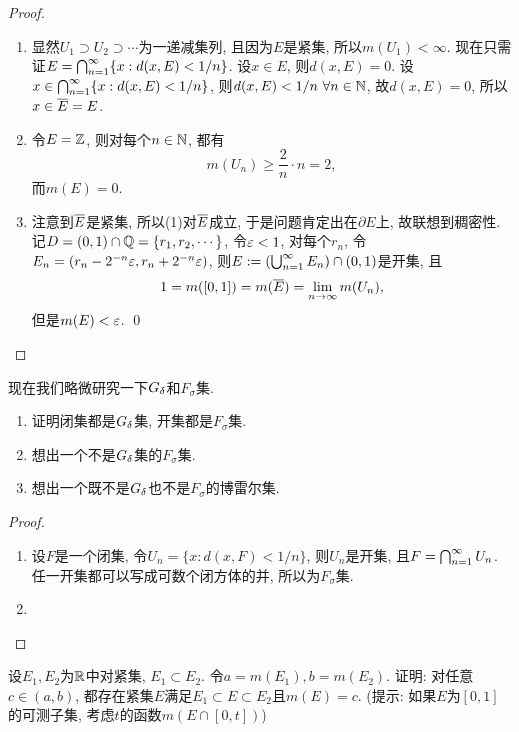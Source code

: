 \begin{proof}
    \begin{enumerate}
    \item 显然$U_1 \supset U_2 \supset \cdots$为一递减集列, 且因为$E$是紧集, 所以$m(U_1) < \infty$. 
    现在只需证$E = \bigcap_{n=1}^{\infty}\{x:d(x,E) < 1/n\}$. 设$x \in E$, 则$d(x,E)=0$. 设$x \in  \bigcap_{n=1}^{\infty}\{x:d(x,E) < 1/n\}$, 则$d(x,E) < 1/n~\forall n \in \mathbb{N}$, 故$d(x,E) = 0$, 所以$x \in \overline{E} = E$. 
    \item 令$E = \mathbb{Z}$, 则对每个$n \in \mathbb{N}$, 都有
    $$m(U_n) \geq \frac{2}{n} \cdot n = 2, $$
    而$m(E) = 0$. 
    \item 注意到$\overline{E}$是紧集, 所以(1)对$\overline{E}$成立, 于是问题肯定出在$\partial E$上, 故联想到稠密性. 记$D=(0,1) \cap \mathbb{Q} = \{r_1, r_2, \cdots\}$, 令$\varepsilon < 1$, 对每个$r_n$, 令$E_n = (r_n - 2^{-n}\varepsilon, r_n + 2^{-n}\varepsilon)$, 则$E := (\bigcup_{n=1}^{\infty}E_n) \cap (0,1)$是开集, 
    且$$ 1 = m([0,1]) = m(\overline{E}) = \lim_{n \to \infty}m(U_n), $$
    但是$m(E) < \varepsilon$. \qed 
    \end{enumerate}
\end{proof}

现在我们略微研究一下$G_\delta$和$F_\sigma$集.
\begin{exercise}
    \begin{enumerate}
    \item 证明闭集都是$G_\delta$集, 开集都是$F_\sigma$集.
    \item 想出一个不是$G_\delta$集的$F_\sigma$集.
    \item 想出一个既不是$G_\delta$也不是$F_\sigma$的博雷尔集. 
    \end{enumerate}
\end{exercise}
\begin{proof}
    \begin{enumerate}
    \item 设$F$是一个闭集, 令$U_n = \{x: d(x,F) < 1/n\}$, 则$U_n$是开集, 且$F = \bigcap_{n=1}^{\infty}U_n$. 任一开集都可以写成可数个闭方体的并, 所以为$F_\sigma$集. 
    \item 
    \end{enumerate}
\end{proof}
\begin{exercise} %
    设$E_1,E_2$为$\mathbb{R}$中对紧集, $E_1 \subset E_2$. 令$a = m(E_1), b = m(E_2)$. 
    证明: 对任意$c \in (a,b)$, 都存在紧集$E$满足$E_1 \subset E \subset E_2$且$m(E)=c$. 
    (提示: 如果$E$为$[0,1]$的可测子集, 考虑$t$的函数$m(E \cap [0,t])$)
\end{exercise}

